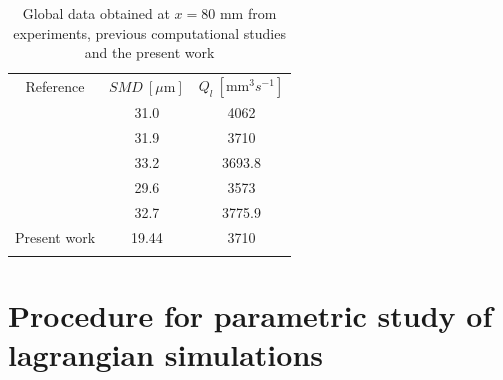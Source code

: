 \begin{table}[!h]
\centering
\caption{Global data obtained at $x = 80$ mm from experiments, previous computational studies and the present work}
\begin{tabular}{ccc}
\thickhline
Reference & $SMD~\left[ \mu \mathrm{m}\right]$  & $Q_l~\left[ \mathrm{mm}^3 s^{-1} \right]$ \\
\thickhline
{} & 31.0 &   4062  \\  
 & 31.9  & 3710  \\
 & 33.2 &  3693.8  \\
 & 29.6  & 3573  \\
 & 32.7  & 3775.9  \\
Present work & 19.44 & 3710 \\
\thickhline
\end{tabular}
\label{tab:previous_numerical_studies_on_jicf_dlr_values}
\end{table}



\vspace*{-0.2in}

\section{Procedure for parametric study of lagrangian simulations}


